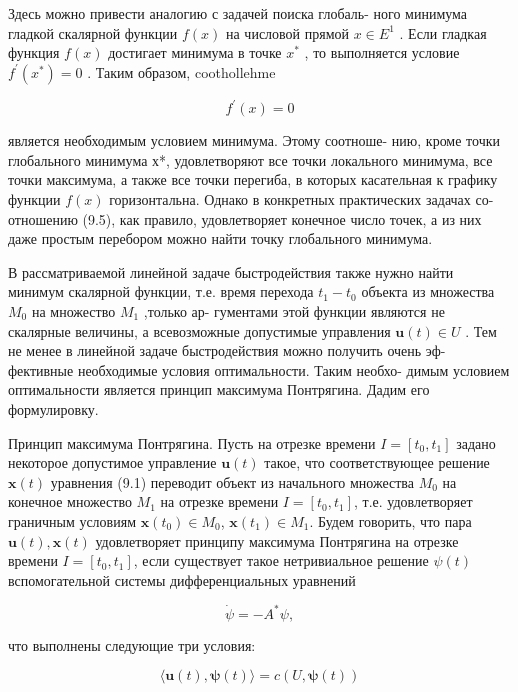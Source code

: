 \documentclass[8pt]{extarticle}
\begin{document}
Здесь можно привести аналогию с задачей поиска глобаль- ного минимума гладкой скалярной функции \(f\left( x\right)\) на числовой прямой \(x \in  {E}^{1}\) . Если гладкая функция \(f\left( x\right)\) достигает минимума в точке \({x}^{ * }\) , то выполняется условие \({f}^{\prime }\left( {x}^{ * }\right)  = 0\) . Таким образом, coothollehme

\[
{f}^{\prime }\left( x\right)  = 0 \tag{9.5}
\]

является необходимым условием минимума. Этому соотноше- нию, кроме точки глобального минимума х*, удовлетворяют все точки локального минимума, все точки максимума, а также все точки перегиба, в которых касательная к графику функции \(f\left( x\right)\) горизонтальна. Однако в конкретных практических задачах со- отношению (9.5), как правило, удовлетворяет конечное число точек, а из них даже простым перебором можно найти точку глобального минимума.

В рассматриваемой линейной задаче быстродействия также нужно найти минимум скалярной функции, т.е. время перехода \({t}_{1} - {t}_{0}\) объекта из множества \({M}_{0}\) на множество \({M}_{1}\) ,только ар- гументами этой функции являются не скалярные величины, а всевозможные допустимые управления \(\mathbf{u}\left( t\right)  \in  U\) . Тем не менее в линейной задаче быстродействия можно получить очень эф- фективные необходимые условия оптимальности. Таким необхо- димым условием оптимальности является принцип максимума Понтрягина. Дадим его формулировку.

Принцип максимума Понтрягина. Пусть на отрезке времени \(I = \left[ t_{0},t_{1}\right]\) задано некоторое допустимое управление \(\mathbf{u}\left( t\right)\) такое, что соответствующее решение \(\mathbf{x}(t)\) уравнения (9.1) переводит объект из начального множества \(M_{0}\) на конечное множество \(M_{1}\) на отрезке времени \(I = \left[ t_{0},t_{1}\right]\), т.е. удовлетворяет граничным условиям \(\mathbf{x}\left( t_{0}\right) \in M_{0}\), \(\mathbf{x}\left( t_{1}\right) \in M_{1}\). Будем говорить, что пара \(\mathbf{u}\left( t\right), \mathbf{x}\left( t\right)\) удовлетворяет принципу максимума Понтрягина на отрезке времени \(I = \left[ t_{0},t_{1}\right]\), если существует такое нетривиальное решение \(\psi(t)\) вспомогательной системы дифференциальных уравнений

\[
\dot{\psi } =  - {A}^{ * }\psi , \tag{9.6}
\]

что выполнены следующие три условия:

\[
\langle \mathbf{u}\left( t\right) ,\mathbf{\psi }\left( t\right) \rangle  = c\left( {U,\mathbf{\psi }\left( t\right) }\right) \tag{9.7}
\]
\end{document}
